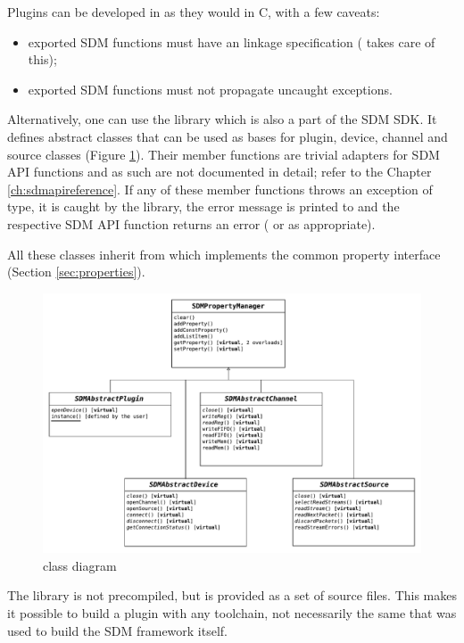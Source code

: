 \documentclass[a4paper,12pt,twoside,extrafontsizes]{memoir}
\begin{document}
Plugins can be developed in \cplusplus{} as they would in C, with a few caveats:

\begin{itemize}
	\item exported SDM functions must have an  linkage specification ( takes care of this);
	\item exported SDM functions must not propagate uncaught exceptions.
\end{itemize}

Alternatively, one can use the  library which is also a part of the SDM SDK. It defines abstract classes that can be used as bases for plugin, device, channel and source classes (Figure \ref{fig:pluginprovider}). Their member functions are trivial adapters for SDM API functions and as such are not documented in detail; refer to the Chapter \ref{ch:sdmapireference}. If any of these member functions throws an exception of  type, it is caught by the library, the error message is printed to  and the respective SDM API function returns an error ( or  as appropriate).

All these classes inherit from  which implements the common property interface (Section \ref{sec:properties}).

\begin{figure}[htbp]
\centering
\includegraphics[scale=0.75,angle=90]{images/pluginprovider.pdf}
\caption{ class diagram}
\label{fig:pluginprovider}
\end{figure}

The  library is not precompiled, but is provided as a set of source files. This makes it possible to build a plugin with any toolchain, not necessarily the same that was used to build the SDM framework itself.
\end{document}
